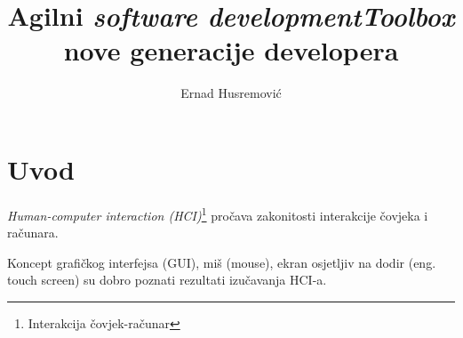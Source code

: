 \documentclass[times, utf8, seminar]{fit}
\begin{document}
\setlength{\parindent}{0pt}


\title{Agilni \emph{software development}\newline \emph{Toolbox} nove generacije developera}







\author{Ernad Husremović}

\maketitle

\tableofcontents

\newpage

%
%


\chapter{Uvod}

\emph{Human-computer interaction (HCI)}\footnote{Interakcija čovjek-računar} pročava zakonitosti interakcije čovjeka i računara.

Koncept grafičkog interfejsa (GUI), miš (mouse), ekran osjetljiv na dodir (eng. touch screen) su dobro poznati rezultati izučavanja HCI-a.
\end{document}
